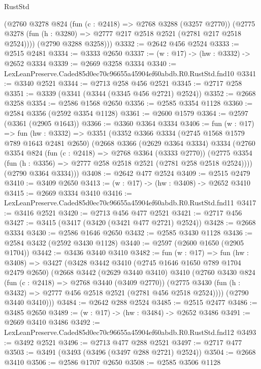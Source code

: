 \begin{lexlean}{RustStd}
\begin{coremodule}
        (@2760
          @3278
          @824
          (fun (c : @2418) => @2768 @3288 (@3257 @2770))
          (@2775 @3278 (fun (h : @3280) => @2777 @217 @2518 @2521 (@2781 @217 @2518 @2524))))
        (@2790 @3288 @3258)))
@3332 := @2642 @456 @2524
@3333 := @2515 @2481
@3334 := @3333 @2650
@3337 := (w : @17) -> (hw : @3332) -> @2652 @3334
@3339 := @2669 @3258 @3334
@3340 := LexLeanPreserve.Caded85d0ec70c96655a45904ef60abdb.R0.RustStd.fnd10
@3341 := @3340 @2521
@3344 := @2713 @258 @456 @2521
@3345 := @2717 @258
@3351 := @3339 (@3341 (@3344 (@3345 @456 @2721) @2524))
@3352 := @2668 @3258
@3354 := @2586 @1568 @2650
@3356 := @2585 @3354 @1128
@3360 := @2584 @3356 (@2592 @3354 @1128)
@3361 := @2600 @1579
@3364 := @2597 (@3361 (@2905 @1643))
@3366 := @3360 @3364 @3334
@3406 := fun (w : @17) =>
  fun (hw : @3332) =>
  @3351
    (@3352
      @3366
      @3334
      (@2745 @1568 @1579 @789 @1643 @2481 @2650)
      (@2668
        @3366
        (@2629 @3364 @3334)
        @3334
        (@2760
          @3354
          @824
          (fun (c : @2418) => @2768 @3364 (@3333 @2770))
          (@2775 @3354 (fun (h : @3356) => @2777 @258 @2518 @2521 (@2781 @258 @2518 @2524))))
        (@2790 @3364 @3334)))
@3408 := @2642 @477 @2524
@3409 := @2515 @2479
@3410 := @3409 @2650
@3413 := (w : @17) -> (hw : @3408) -> @2652 @3410
@3415 := @2669 @3334 @3410
@3416 := LexLeanPreserve.Caded85d0ec70c96655a45904ef60abdb.R0.RustStd.fnd11
@3417 := @3416 @2521
@3420 := @2713 @456 @477 @2521
@3421 := @2717 @456
@3427 := @3415 (@3417 (@3420 (@3421 @477 @2721) @2524))
@3428 := @2668 @3334
@3430 := @2586 @1646 @2650
@3432 := @2585 @3430 @1128
@3436 := @2584 @3432 (@2592 @3430 @1128)
@3440 := @2597 (@2600 @1650 (@2905 @1704))
@3442 := @3436 @3440 @3410
@3482 := fun (w : @17) =>
  fun (hw : @3408) =>
  @3427
    (@3428
      @3442
      @3410
      (@2745 @1646 @1650 @789 @1704 @2479 @2650)
      (@2668
        @3442
        (@2629 @3440 @3410)
        @3410
        (@2760
          @3430
          @824
          (fun (c : @2418) => @2768 @3440 (@3409 @2770))
          (@2775 @3430 (fun (h : @3432) => @2777 @456 @2518 @2521 (@2781 @456 @2518 @2524))))
        (@2790 @3440 @3410)))
@3484 := @2642 @288 @2524
@3485 := @2515 @2477
@3486 := @3485 @2650
@3489 := (w : @17) -> (hw : @3484) -> @2652 @3486
@3491 := @2669 @3410 @3486
@3492 := LexLeanPreserve.Caded85d0ec70c96655a45904ef60abdb.R0.RustStd.fnd12
@3493 := @3492 @2521
@3496 := @2713 @477 @288 @2521
@3497 := @2717 @477
@3503 := @3491 (@3493 (@3496 (@3497 @288 @2721) @2524))
@3504 := @2668 @3410
@3506 := @2586 @1707 @2650
@3508 := @2585 @3506 @1128

\end{coremodule}
\end{lexlean}
